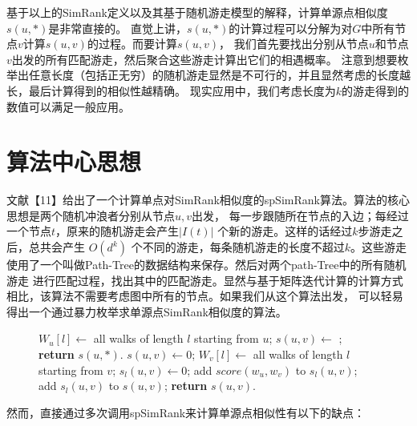 \documentclass[master]{njuthesis}
\begin{document}
基于以上的SimRank定义以及其基于随机游走模型的解释，计算单源点相似度 $s(u,*)$是非常直接的。
直觉上讲，$s(u,*)$的计算过程可以分解为对$G$中所有节点$v$计算$s(u,v)$的过程。而要计算$s(u,v)$，
我们首先要找出分别从节点$u$和节点$v$出发的所有匹配游走，然后聚合这些游走计算出它们的相遇概率。
注意到想要枚举出任意长度（包括正无穷）的随机游走显然是不可行的，并且显然考虑的长度越长，最后计算得到的相似性越精确。
现实应用中，我们考虑长度为$k$的游走得到的数值可以满足一般应用。
\section{算法中心思想}
文献【11】给出了一个计算单点对SimRank相似度的spSimRank算法。算法的核心思想是两个随机冲浪者分别从节点$u,v$出发，
每一步跟随所在节点的入边；每经过一个节点$t$，原来的随机游走会产生$|I(t)|$ 个新的游走。这样的话经过$k$步游走之后，总共会产生
$O(d^k)$ 个不同的游走，每条随机游走的长度不超过$k$。这些游走使用了一个叫做Path-Tree的数据结构来保存。然后对两个path-Tree中的所有随机游走
进行匹配过程，找出其中的匹配游走。显然与基于矩阵迭代计算的计算方式相比，该算法不需要考虑图中所有的节点。如果我们从这个算法出发，
可以轻易得出一个通过暴力枚举求单源点SimRank相似度的算法。

\begin{figure}
\begin{algorithm}[H]
\label{algo:nssSimRank}
\begin{algorithmic}[1]
		\State $W_u[l] \gets $ all walks of length $l$ starting from $u$;
	\EndFor
		\State $s(u,v)\gets$  ;
	\EndFor
	\State \textbf{return} $s(u, *)$.
\EndProcedure
{}
\State $s(u, v) \gets 0$;
	\State $W_v[l] \gets $ all walks of length $l$ starting from $v$;
	\State $s_l(u, v) \gets 0$;
			\State add  $score(w_u, w_v)$ to  $s_l(u, v)$;
		\EndIf
		\EndFor
	\EndFor
	\State add $s_l(u, v)$ to $s(u, v)$;
\EndFor
\State \textbf{return} $s(u, v)$.
\EndProcedure
\end{algorithmic}
\end{algorithm}
\end{figure}
然而，直接通过多次调用spSimRank来计算单源点相似性有以下的缺点：
\end{document}
